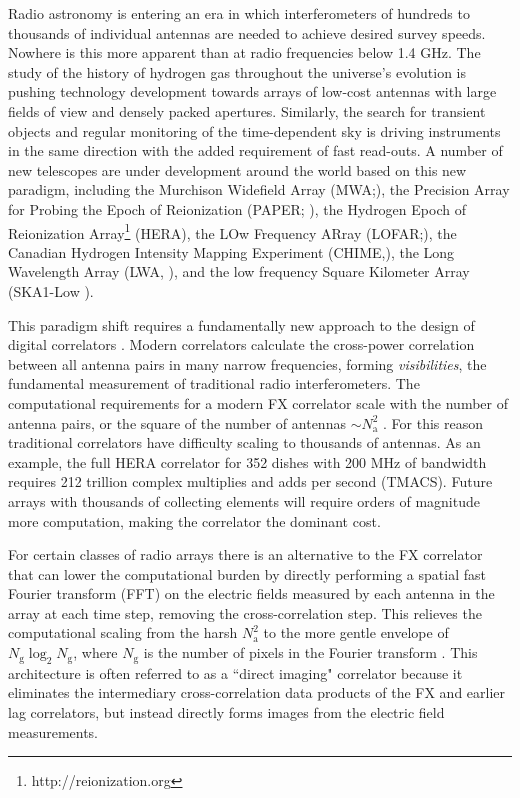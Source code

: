 \documentclass[a4paper,fleqn,usenatbib]{mnras}
\newcommand{\Nant}{N_\textrm{a}}
\newcommand{\Ngrid}{N_\textrm{g}}
\begin{document}
Radio astronomy is entering an era in which interferometers of hundreds to
thousands of individual antennas are needed to achieve desired survey speeds.
Nowhere is this more apparent than at radio frequencies below 1.4 GHz. The study
of the history of hydrogen gas throughout the universe's evolution is pushing
technology development towards arrays of low-cost antennas with large fields of
view and densely packed apertures. Similarly, the search for transient objects
and regular monitoring of the time-dependent sky is driving instruments in the
same direction with the added requirement of fast read-outs. A number of new 
telescopes are under development around the world based on this new paradigm, 
including the Murchison Widefield Array (MWA;\citealt{tin13,bow13}), the 
Precision Array for Probing the Epoch of Reionization (PAPER; \citealt{par10}), 
the Hydrogen Epoch of Reionization Array\footnote{http://reionization.org} 
(HERA), the LOw Frequency ARray (LOFAR;\citealt{van13}), the Canadian Hydrogen 
Intensity Mapping Experiment (CHIME,\citealt{ban14}), the Long Wavelength 
Array (LWA, \citealt{ell13}), and the low frequency Square Kilometer Array 
(SKA1-Low \citealt{mel13}).

This paradigm shift requires a fundamentally new approach to the design of
digital correlators \citep{lon00}. Modern correlators calculate the cross-power
correlation between all antenna pairs in many narrow frequencies, forming
\emph{visibilities}, the fundamental measurement of traditional radio
interferometers. The computational requirements for a modern FX correlator scale
with the number of antenna pairs, or the square of the number of antennas $\sim
\Nant^2$ \citep{bun04}. For this reason traditional correlators have difficulty
scaling to thousands of antennas. As an example, the full HERA correlator for
352 dishes with 200 MHz of bandwidth requires 212 trillion complex multiplies
and adds per second (TMACS). Future arrays with thousands of collecting elements
will require orders of magnitude more computation, making the correlator the
dominant cost.

For certain classes of radio arrays there is an alternative to the FX correlator
that can lower the computational burden by directly performing a spatial fast
Fourier transform (FFT) on the electric fields measured by each antenna in the
array at each time step, removing the cross-correlation step. This relieves the
computational scaling from the harsh $\Nant^2$ to the more gentle envelope of
$\Ngrid\log_2\Ngrid$, where $\Ngrid$ is the number of pixels in the Fourier 
transform \citep[e.g.][]{mor11,teg09,teg10}. This architecture is often referred 
to as a ``direct imaging" correlator because it eliminates the intermediary 
cross-correlation data products of the FX and earlier lag correlators, but 
instead directly forms images from the electric field measurements.
\end{document}
